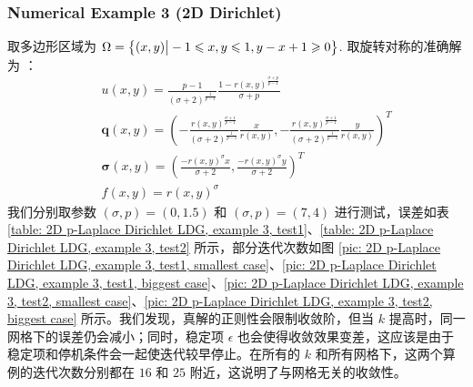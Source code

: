 \begin{longtable}{| c | c c | c c | c c | c c |}
\end{longtable}



\subsubsection{Numerical Example 3 (2D Dirichlet)}

取多边形区域为 \(\Omega = \left\{(x,y) \big| -1\leqslant x, y \leqslant 1, y-x+1\geqslant 0\right\}\). 取旋转对称的准确解为 \cite{10.1090/S0025-5718-1993-1192966-4, 10.1137/15M1008014}：
\begin{subequations}
	\begin{eqnarray}
		&& u(x,y) = \frac{p-1}{(\sigma + 2)^{\frac{1}{p-1}}} \frac{1 - r(x,y)^{\frac{\sigma + p}{p-1}}}{\sigma + p} \\
		&& \bm q(x,y) = \left(-\frac{r(x,y)^{\frac{\sigma+1}{p-1}}}{(\sigma + 2)^{\frac{1}{p-1}}} \frac{x}{r(x,y)}, -\frac{r(x,y)^{\frac{\sigma+1}{p-1}}}{(\sigma + 2)^{\frac{1}{p-1}}} \frac{y}{r(x,y)}\right)^{T} \\
		&& \bm\sigma(x,y) = \left(\frac{-r(x,y)^{\sigma} x}{\sigma + 2}, \frac{-r(x,y)^{\sigma} y}{\sigma + 2}\right)^{T} \\
		&& f(x,y) = r(x,y)^{\sigma}
	\end{eqnarray}
\end{subequations}
我们分别取参数 \((\sigma, p) = (0, 1.5)\) 和 \((\sigma, p) = (7, 4)\) 进行测试，误差如表 \ref{table: 2D p-Laplace Dirichlet LDG, example 3, test1}、\ref{table: 2D p-Laplace Dirichlet LDG, example 3, test2} 所示，部分迭代次数如图 \ref{pic: 2D p-Laplace Dirichlet LDG, example 3, test1, smallest case}、\ref{pic: 2D p-Laplace Dirichlet LDG, example 3, test1, biggest case}、\ref{pic: 2D p-Laplace Dirichlet LDG, example 3, test2, smallest case}、\ref{pic: 2D p-Laplace Dirichlet LDG, example 3, test2, biggest case} 所示。我们发现，真解的正则性会限制收敛阶，但当 \(k\) 提高时，同一网格下的误差仍会减小；同时，稳定项 \(\epsilon\) 也会使得收敛效果变差，这应该是由于稳定项和停机条件会一起使迭代较早停止。在所有的 \(k\) 和所有网格下，这两个算例的迭代次数分别都在 \(16\) 和 \(25\) 附近，这说明了与网格无关的收敛性。

